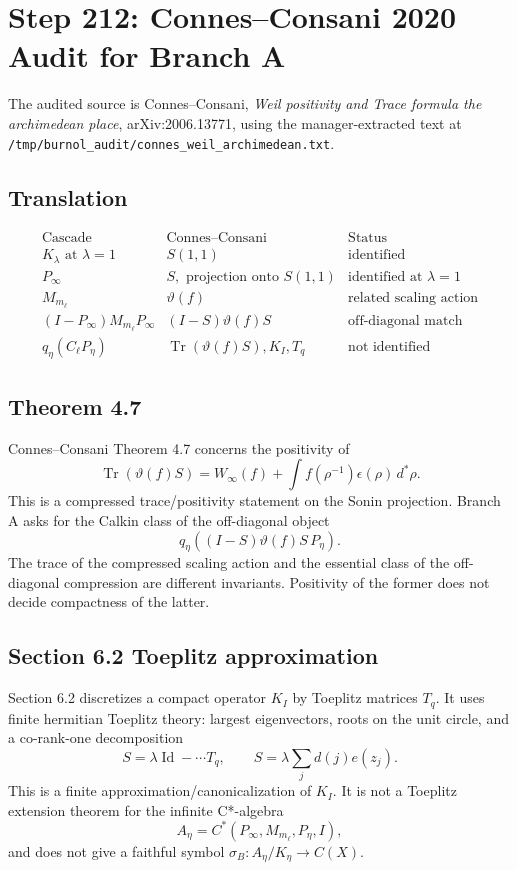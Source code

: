 \documentclass[11pt]{article}
\begin{document}
\section*{Step 212: Connes--Consani 2020 Audit for Branch A}

The audited source is Connes--Consani, \emph{Weil positivity and Trace formula
the archimedean place}, arXiv:2006.13771, using the manager-extracted text at
\texttt{/tmp/burnol\_audit/connes\_weil\_archimedean.txt}.

\subsection*{Translation}

\[
\begin{array}{lll}
\text{Cascade} & \text{Connes--Consani} & \text{Status}\\
\hline
K_\lambda \text{ at }\lambda=1 & S(1,1) & \text{identified}\\
P_\infty & S,\text{ projection onto }S(1,1) & \text{identified at }\lambda=1\\
M_{m_\ell} & \vartheta(f) & \text{related scaling action}\\
(I-P_\infty)M_{m_\ell}P_\infty & (I-S)\vartheta(f)S & \text{off-diagonal match}\\
q_\eta(C_\ell P_\eta) & \operatorname{Tr}(\vartheta(f)S), K_I,T_q & \text{not identified}
\end{array}
\]

\subsection*{Theorem 4.7}

Connes--Consani Theorem 4.7 concerns the positivity of
\[
  \operatorname{Tr}(\vartheta(f)S)
  =W_\infty(f)+\int f(\rho^{-1})\epsilon(\rho)\,d^*\rho.
\]
This is a compressed trace/positivity statement on the Sonin projection.
Branch A asks for the Calkin class of the off-diagonal object
\[
  q_\eta((I-S)\vartheta(f)S\,P_\eta).
\]
The trace of the compressed scaling action and the essential class of the
off-diagonal compression are different invariants.  Positivity of the former
does not decide compactness of the latter.

\subsection*{Section 6.2 Toeplitz approximation}

Section 6.2 discretizes a compact operator \(K_I\) by Toeplitz matrices \(T_q\).
It uses finite hermitian Toeplitz theory: largest eigenvectors, roots on the
unit circle, and a co-rank-one decomposition
\[
  S=\lambda\operatorname{Id} - \cdots T_q,
  \qquad
  S=\lambda\sum_j d(j)e(z_j).
\]
This is a finite approximation/canonicalization of \(K_I\).  It is not a
Toeplitz extension theorem for the infinite C*-algebra
\[
  A_\eta=C^*(P_\infty,M_{m_\ell},P_\eta,I),
\]
and does not give a faithful symbol
\(\sigma_B:A_\eta/K_\eta\to C(X)\).
\end{document}
